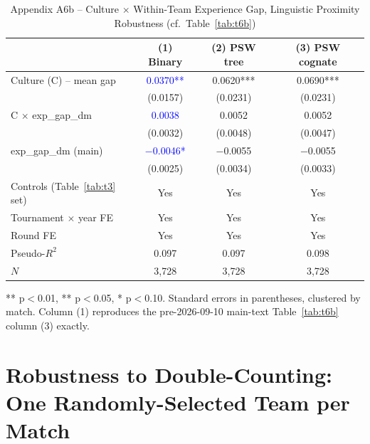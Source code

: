 \documentclass[10pt]{article}
\begin{document}
\begin{table}[htbp]
\centering
\caption{Appendix A6b -- Culture $\times$ Within-Team Experience Gap, Linguistic Proximity Robustness (cf.\ Table~\ref{tab:t6b}) \label{tab:a6b}}
\begin{threeparttable}
\begin{tabular}{lccc}
\toprule
 & (1) Binary & (2) PSW tree & (3) PSW cognate \\
\midrule
Culture (C) -- mean gap & \textcolor{blue}{0.0370**} & 0.0620*** & 0.0690*** \\
 & (0.0157) & (0.0231) & (0.0231) \\
C $\times$ exp\_gap\_dm & \textcolor{blue}{0.0038} & 0.0052 & 0.0052 \\
 & (0.0032) & (0.0048) & (0.0047) \\
exp\_gap\_dm (main) & \textcolor{blue}{$-$0.0046*} & $-$0.0055 & $-$0.0055 \\
 & (0.0025) & (0.0034) & (0.0033) \\
\midrule
Controls (Table~\ref{tab:t3} set) & Yes & Yes & Yes \\
Tournament $\times$ year FE & Yes & Yes & Yes \\
Round FE & Yes & Yes & Yes \\
Pseudo-$R^2$ & 0.097 & 0.097 & 0.098 \\
$N$ & 3,728 & 3,728 & 3,728 \\
\bottomrule
\end{tabular}
\begin{tablenotes}
\small
\item *** p$<$0.01, ** p$<$0.05, * p$<$0.10. Standard errors in parentheses, clustered by match. Column (1) reproduces the pre-2026-09-10 main-text Table~\ref{tab:t6b} column (3) exactly.
\end{tablenotes}
\end{threeparttable}
\end{table}
\FloatBarrier


\section{Robustness to Double-Counting: One Randomly-Selected Team per Match}
\label{app:randone}
\end{document}
